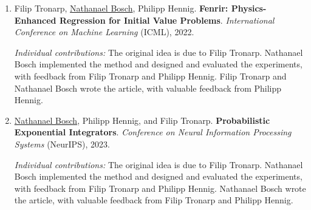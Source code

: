 \documentclass{mimosis}
\begin{document}
\begin{enumerate}[label=\Roman*]
\item
\hypertarget{fenrir}{
Filip Tronarp\equalc{}, \underline{Nathanael Bosch}\equalc{}, Philipp Hennig.
\textbf{Fenrir: Physics-Enhanced Regression for Initial Value Problems}.
\emph{International Conference on Machine Learning}
(ICML),
2022.
}
\par \emph{Individual contributions:}
The original idea is due to Filip Tronarp.
Nathanael Bosch implemented the method and designed and evaluated the experiments, with feedback from Filip Tronarp and Philipp Hennig.
Filip Tronarp and Nathanael Bosch wrote the article, with valuable feedback from Philipp Hennig.

\item
\hypertarget{probexpint}{
\underline{Nathanael Bosch}, Philipp Hennig, and Filip Tronarp.
\textbf{Probabilistic Exponential Integrators}.
\emph{Conference on Neural Information Processing Systems}
(NeurIPS),
2023.
}
\par \emph{Individual contributions:}
The original idea is due to Filip Tronarp. %
Nathanael Bosch implemented the method and designed and evaluated the experiments, with feedback from Filip Tronarp and Philipp Hennig.
Nathanael Bosch wrote the article, with valuable feedback from Filip Tronarp and Philipp Hennig.


\end{enumerate}
\end{document}
